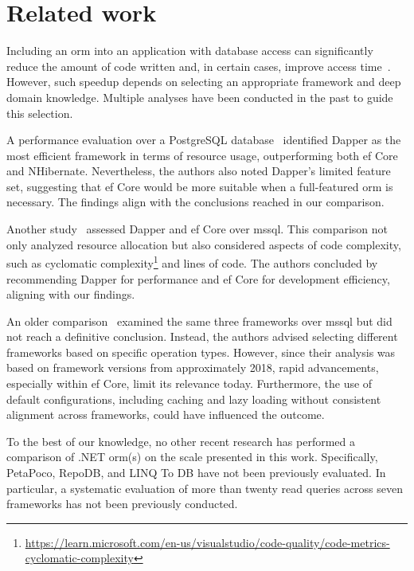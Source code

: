 \chapter{Related work}\label{chapter:related_work}
Including an \acrshort{orm} into an application with database access can significantly reduce the amount of code written and, in certain cases, improve access time~\cite{optimizatio_code_lines_time}. However, such speedup depends on selecting an appropriate framework and deep domain knowledge. Multiple analyses have been conducted in the past to guide this selection.

A performance evaluation over a PostgreSQL database~\cite{orm_comp_postgre} identified Dapper as the most efficient framework in terms of resource usage, outperforming both \acrshort{ef} Core and NHibernate. Nevertheless, the authors also noted Dapper's limited feature set, suggesting that \acrshort{ef} Core would be more suitable when a full-featured \acrshort{orm} is necessary. The findings align with the conclusions reached in our comparison.

Another study~\cite{myllyahoforsberg2022orm} assessed Dapper and \acrshort{ef} Core over \acrshort{mssql}. This comparison not only analyzed resource allocation but also considered aspects of code complexity, such as cyclomatic complexity\footnote{\url{https://learn.microsoft.com/en-us/visualstudio/code-quality/code-metrics-cyclomatic-complexity}} and lines of code. The authors concluded by recommending Dapper for performance and \acrshort{ef} Core for development efficiency, aligning with our findings.

An older comparison~\cite{orm_comp_2020} examined the same three frameworks over \acrshort{mssql} but did not reach a definitive conclusion. Instead, the authors advised selecting different frameworks based on specific operation types. However, since their analysis was based on framework versions from approximately 2018, rapid advancements, especially within \acrshort{ef} Core, limit its relevance today. Furthermore, the use of default configurations, including caching and lazy loading without consistent alignment across frameworks, could have influenced the outcome.

To the best of our knowledge, no other recent research has performed a comparison of .NET \acrshort{orm}(s) on the scale presented in this work. Specifically, PetaPoco, RepoDB, and LINQ To DB have not been previously evaluated. In particular, a systematic evaluation of more than twenty read queries across seven frameworks has not been previously conducted.

